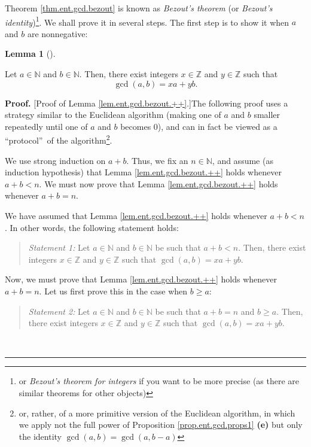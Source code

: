 \documentclass[numbers=enddot,12pt,final,onecolumn,notitlepage]{scrartcl}%
\numberwithin{exer}{subsection}
\theoremstyle{definition}
\newtheorem{lem}[theo]{Lemma}
\newenvironment{lemma}[1][]
{\begin{lem}[#1]\begin{leftbar}}
{\end{leftbar}\end{lem}}
\newenvironment{statement}{\begin{quote}}{\end{quote}}
\newenvironment{proof}[1][Proof]{\noindent\textbf{#1.} }{\ \rule{0.5em}{0.5em}}
\begin{document}
Theorem \ref{thm.ent.gcd.bezout} is known as \textit{Bezout's theorem} (or
\textit{Bezout's identity})\footnote{or \textit{Bezout's theorem for integers}
if you want to be more precise (as there are similar theorems for other
objects)}. We shall prove it in several steps. The first step is to show it
when $a$ and $b$ are nonnegative:

\begin{lemma}
\label{lem.ent.gcd.bezout.++}Let $a\in\mathbb{N}$ and $b\in\mathbb{N}$. Then,
there exist integers $x\in\mathbb{Z}$ and $y\in\mathbb{Z}$ such that%
\[
\gcd\left(  a,b\right)  =xa+yb.
\]

\end{lemma}

\begin{proof}
[Proof of Lemma \ref{lem.ent.gcd.bezout.++}.]The following proof uses a
strategy similar to the Euclidean algorithm (making one of $a$ and $b$ smaller
repeatedly until one of $a$ and $b$ becomes $0$), and can in fact be viewed as
a \textquotedblleft protocol\textquotedblright\ of the algorithm\footnote{or,
rather, of a more primitive version of the Euclidean algorithm, in which we
apply not the full power of Proposition \ref{prop.ent.gcd.props1} \textbf{(e)}
but only the identity $\gcd\left(  a,b\right)  =\gcd\left(  a,b-a\right)  $}.

We use strong induction on $a+b$. Thus, we fix an $n\in\mathbb{N}$, and assume
(as induction hypothesis) that Lemma \ref{lem.ent.gcd.bezout.++} holds
whenever $a+b<n$. We must now prove that Lemma \ref{lem.ent.gcd.bezout.++}
holds whenever $a+b=n$.

We have assumed that Lemma \ref{lem.ent.gcd.bezout.++} holds whenever $a+b<n$.
In other words, the following statement holds:

\begin{statement}
\textit{Statement 1:} Let $a\in\mathbb{N}$ and $b\in\mathbb{N}$ be such that
$a+b<n$. Then, there exist integers $x\in\mathbb{Z}$ and $y\in\mathbb{Z}$ such
that $\gcd\left(  a,b\right)  =xa+yb$.
\end{statement}

Now, we must prove that Lemma \ref{lem.ent.gcd.bezout.++} holds whenever
$a+b=n$. Let us first prove this in the case when $b\geq a$:

\begin{statement}
\textit{Statement 2:} Let $a\in\mathbb{N}$ and $b\in\mathbb{N}$ be such that
$a+b=n$ and $b\geq a$. Then, there exist integers $x\in\mathbb{Z}$ and
$y\in\mathbb{Z}$ such that $\gcd\left(  a,b\right)  =xa+yb$.
\end{statement}


\end{proof}
\end{document}
